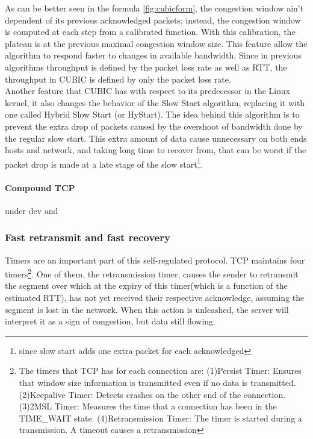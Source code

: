 As can be better seen in the formula \ref{fig:cubicform}, the congestion
window ain't dependent of its previous acknowledged packets; instead, the
congestion window is computed at each step from a calibrated function. With
this calibration, the plateau is at the previous maximal congestion window
size. This feature allow the algorithm to respond faster to changes in
available bandwidth. Since in previous algorithms throughput is defined by the
packet loss rate as well as RTT, the throughput in CUBIC is defined by only
the packet loss rate.\\

Another feature that CUBIC has with respect to its predecessor in the Linux
kernel, it also changes the behavior of the Slow Start algorithm, replacing it
with one called Hybrid Slow Start (or HyStart)\cite{HaElephants}. The idea
behind this algorithm is to prevent the extra drop of packets caused by the
overshoot of bandwidth done by the regular slow start. This extra amount of
data cause unnecessary on both ends hosts and network, and taking long time to
recover from, that can be worst if the packet drop is made at a late stage of
the slow start\footnote{since slow start adds one extra packet for each
acknowledged}.\\

\paragraph{Compound TCP} under dev \cite{Tan06compoundtcp} and \cite{4146841}\\

\subsubsection{Fast retransmit and fast recovery} Timers are an important part
of this self-regulated protocol. TCP maintains four timers\footnote{The timers
that TCP has for each connection are: (1)Persist Timer: Ensures that window size information is transmitted even 
if no data is transmitted. (2)Keepalive Timer: Detects crashes on the other end of the
connection. (3)2MSL Timer: Measures the time that a connection has been in
the TIME\_WAIT state. (4)Retransmission Timer: The timer is started during a
transmission. A timeout causes a retransmission}.
One of them, the retransmission timer, causes the sender to retransmit the
segment over which at the expiry of this timer(which is a function of the
estimated RTT), has not yet received their respective acknowledge, assuming
the segment is lost in the network. When this action is unleashed, the server
will interpret it as a sign of congestion, but data still flowing.\\

